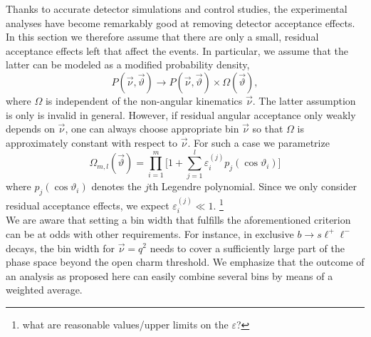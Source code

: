 \documentclass[aps,prd,reprint,nofootinbib,preprintnumbers]{revtex4}
\newcommand{\nuvec}{\vec{\nu}}
\newcommand{\thvec}{\vec{\vartheta}}
\renewcommand{\theta}{\vartheta}
\let\eps\varepsilon
\newcommand{\danny}[1]{{\color{purple}#1}}
\begin{document}
Thanks to accurate detector simulations and control studies, the experimental analyses have become
remarkably good at removing detector acceptance effects. In this section we therefore assume that
there are only a small, residual acceptance effects left that affect the events. In particular, we
assume that the latter can be modeled as a modified probability density,
\begin{equation}
    \label{eq:PDFwithDE}
    P(\nuvec,\thvec) \to P(\nuvec,\thvec) \times \Omega(\thvec),
\end{equation}
where $\Omega$ is independent of the non-angular kinematics $\nuvec$. The latter assumption is only
is invalid in general. However, if residual angular acceptance only weakly depends on $\vec{\nu}$, one
can always choose appropriate bin $\vec{\nu}$ so that $\Omega$ is approximately constant with respect
to $\vec{\nu}$. For such a case we parametrize
\begin{equation}
    \Omega_{m,l}(\thvec) = \prod_{i=1}^{m} \Big[1 + \sum_{j=1}^l \eps_i^{(j)} p_j(\cos\theta_i)\big]
\end{equation}
where $p_j(\cos\theta_i)$ denotes the $j$th Legendre polynomial. Since we only consider residual
acceptance effects, we expect $\eps_i^{(j)} \ll 1$. \footnote{\danny{what are reasonable values/upper limits on the $\eps$?}}\\

We are aware that setting a bin width that fulfills the aforementioned criterion can be at odds with
other requirements. For instance, in exclusive $b\to s\ell^+\ell^-$ decays, the bin width for
$\vec{\nu} = q^2$ needs to cover a sufficiently large part of the phase space beyond the open charm
threshold. We emphasize that the outcome of an analysis as proposed here can easily combine several
bins by means of a weighted average.\\
\end{document}
